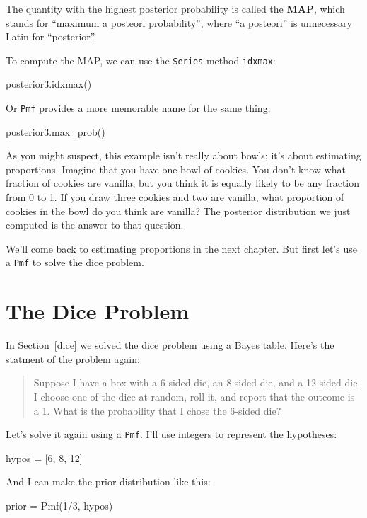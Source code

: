 \documentclass[12pt]{book}
\theoremstyle{exercise}
\newcommand{\py}[1]{{\tt #1}}%
\begin{document}
The quantity with the highest posterior probability is called the {\bf MAP}, which stands for ``maximum a posteori probability'', where ``a posteori'' is unnecessary Latin for ``posterior''.

To compute the MAP, we can use the \py{Series} method \py{idxmax}:

\begin{code}
posterior3.idxmax()
\end{code}

Or \py{Pmf} provides a more memorable name for the same thing:

\begin{code}
 posterior3.max_prob()
\end{code}

As you might suspect, this example isn't really about bowls; it's about estimating proportions.
Imagine that you have one bowl of cookies.
You don't know what fraction of cookies are vanilla, but you think it is equally likely to be any fraction from 0 to 1.
If you draw three cookies and two are vanilla, what proportion of cookies in the bowl do you think are vanilla?
The posterior distribution we just computed is the answer to that question.

We'll come back to estimating proportions in the next chapter.
But first let's use a \py{Pmf} to solve the dice problem.


\section{The Dice Problem}

In Section~\ref{dice} we solved the dice problem using a Bayes table.
Here's the statment of the problem again:

\begin{quote}
Suppose I have a box with a 6-sided die, an 8-sided die, and a 12-sided die.
I choose one of the dice at random, roll it, and report that the outcome is a 1.
What is the probability that I chose the 6-sided die?
\end{quote}

Let's solve it again using a \py{Pmf}.
I'll use integers to represent the hypotheses:

\begin{code}
hypos = [6, 8, 12]
\end{code}

And I can make the prior distribution like this:

\begin{code}
prior = Pmf(1/3, hypos)
\end{code}
\end{document}
